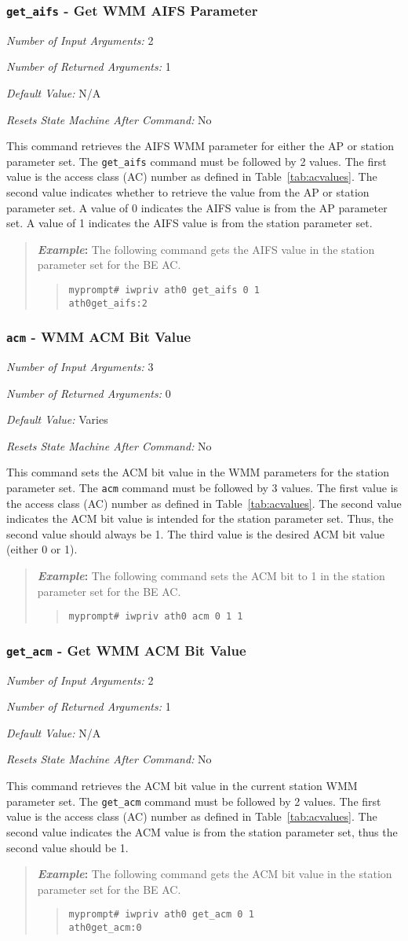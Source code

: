 \documentclass[10pt,fullpage]{article}
\newcommand{\mytt}[1]{{\texttt{#1}}}
\newcommand{\bv}{\begin{verse}}
\newcommand{\ev}{\end{verse}}
\newcommand{\cmd}[1]{{\texttt{myprompt\# #1}}}
\newcommand{\argdesc}[4]{\begin{description}
\itemsep -6pt
\item \textit{Number of Input Arguments:} #1
\item \textit{Number of Returned Arguments:} #2
\item \textit{Default Value:} #3
\item \textit{Resets State Machine After Command:} #4
\end{description}
}
\newenvironment{example}{\begin{quote}\textbf{\textit{Example}:}}{\end{quote}}
\begin{document}
\subsubsection{\mytt{get\_aifs} - Get WMM AIFS Parameter}
\argdesc{2}{1}{N/A}{No}
This command retrieves the AIFS WMM parameter for either the AP
or station parameter set. The \mytt{get\_aifs} command must be
followed by 2 values.  The first value is the access class (AC) number
as defined in Table~\ref{tab:acvalues}.  The second value indicates
whether to retrieve the value from the AP or station parameter set. A
value of 0 indicates the AIFS value is from the AP parameter set.  A
value of 1 indicates the AIFS value is from the station parameter set.
\begin{example}
  The following command gets the AIFS value in the station parameter
  set for the BE AC.
  \bv
  \cmd{iwpriv ath0 get\_aifs 0 1}\\
  \mytt{ath0\hspace{32pt}get\_aifs:2}
  \ev
\end{example}

\subsubsection{\mytt{acm} - WMM ACM Bit Value}
\argdesc{3}{0}{Varies}{No}
This command sets the ACM bit value in the WMM parameters for the
station parameter set.  The \mytt{acm} command must be followed by 3
values.  The first value is the access class (AC) number as defined in
Table~\ref{tab:acvalues}.  The second value indicates the ACM bit
value is intended for the station parameter set.  Thus, the second
value should always be 1.  The third value is the desired ACM bit
value (either 0 or 1).
\begin{example}
  The following command sets the ACM bit to 1 in the station parameter
  set for the BE AC.
  \bv
  \cmd{iwpriv ath0 acm 0 1 1}
  \ev
\end{example}

\subsubsection{\mytt{get\_acm} - Get WMM ACM Bit Value}
\argdesc{2}{1}{N/A}{No}
This command retrieves the ACM bit value in the current station WMM
parameter set.  The \mytt{get\_acm} command must be followed by 2
values.  The first value is the access class (AC) number as defined in
Table~\ref{tab:acvalues}.  The second value indicates the ACM value is
from the station parameter set, thus the second value should be 1.
\begin{example}
  The following command gets the ACM bit value in the station
  parameter set for the BE AC.
  \bv
  \cmd{iwpriv ath0 get\_acm 0 1}\\
  \mytt{ath0\hspace{32pt}get\_acm:0}
  \ev
\end{example}
\end{document}
